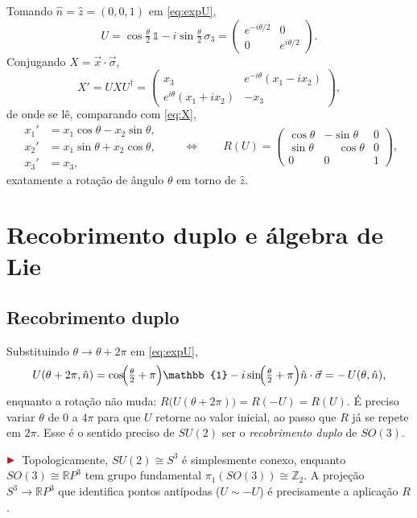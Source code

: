 \documentclass[12pt,a4paper]{article}
\newcommand{\marcador}{\ensuremath{\color{corDestaque}\blacktriangleright}\,}
\newenvironment{nota}{\par\color{corDestaque}\noindent\marcador\ignorespaces}{\par}
\newcommand{\R}{\mathbb{R}}
\newcommand{\Z}{\mathbb{Z}}
\newcommand{\id}{\mathbb{1}}                 %
\newcommand{\dg}{\dagger}
\newcommand{\vsig}{\vec{\sigma}}
\newcommand{\vx}{\vec{x}}
\newcommand{\vn}{\hat{n}}
\theoremstyle{definition}
\theoremstyle{plain}
\theoremstyle{remark}
\begin{document}
Tomando $\vn=\hat z=(0,0,1)$ em \eqref{eq:expU},
\[
  U=\cos\tfrac{\theta}{2}\,\id-i\sin\tfrac{\theta}{2}\,\sigma_3
   =\begin{pmatrix} e^{-i\theta/2} & 0\\ 0 & e^{i\theta/2}\end{pmatrix}.
\]
Conjugando $X=\vx\cdot\vsig$,
\[
  X'=UXU^{\dg}
    =\begin{pmatrix} x_3 & e^{-i\theta}(x_1-ix_2)\\
                     e^{i\theta}(x_1+ix_2) & -x_3\end{pmatrix},
\]
de onde se lê, comparando com \eqref{eq:X},
\[
  \begin{aligned}
    x_1'&=x_1\cos\theta-x_2\sin\theta,\\
    x_2'&=x_1\sin\theta+x_2\cos\theta,\\
    x_3'&=x_3,
  \end{aligned}
  \qquad\Longleftrightarrow\qquad
  R(U)=\begin{pmatrix}
    \cos\theta & -\sin\theta & 0\\
    \sin\theta & \phantom{-}\cos\theta & 0\\
    0 & 0 & 1
  \end{pmatrix},
\]
exatamente a rotação de ângulo $\theta$ em torno de $\hat z$.

\section{Recobrimento duplo e álgebra de Lie}

\subsection*{Recobrimento duplo}
Substituindo $\theta\to\theta+2\pi$ em \eqref{eq:expU},
\[
  U(\theta+2\pi,\vn)
  =\cos\!\Bigl(\tfrac{\theta}{2}+\pi\Bigr)\id
   -i\sin\!\Bigl(\tfrac{\theta}{2}+\pi\Bigr)\vn\cdot\vsig
  =-\,U(\theta,\vn),
\]
enquanto a rotação não muda: $R\bigl(U(\theta+2\pi)\bigr)=R(-U)=R(U)$.
É preciso variar $\theta$ de $0$ a $4\pi$ para que $U$ retorne ao valor
inicial, ao passo que $R$ já se repete em $2\pi$. Esse é o sentido preciso
de $SU(2)$ ser o \emph{recobrimento duplo} de $SO(3)$.

\begin{nota}
Topologicamente, $SU(2)\cong S^3$ é simplesmente conexo, enquanto
$SO(3)\cong \R P^3$ tem grupo fundamental $\pi_1(SO(3))\cong\Z_2$. A
projeção $S^3\to\R P^3$ que identifica pontos antípodas ($U\sim -U$) é
precisamente a aplicação $R$.
\end{nota}
\end{document}
